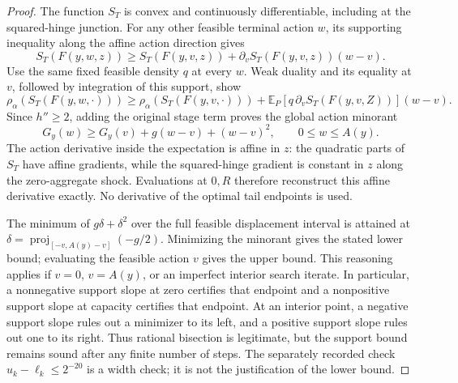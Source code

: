 \begin{proof}
The function $S_T$ is convex and continuously differentiable, including
at the squared-hinge junction.  For any other feasible terminal action $w$,
its supporting inequality along the affine action direction gives
\[
 S_T(F(y,w,z))\ge S_T(F(y,v,z))
           +\partial_vS_T(F(y,v,z))(w-v).
\]
Use the same fixed feasible density $q$ at every $w$.  Weak duality
and its equality at $v$, followed by integration of this support, show
\[
 \rho_\alpha(S_T(F(y,w,\cdot)))
 \ge\rho_\alpha(S_T(F(y,v,\cdot)))
       +\mathbb E_P[q\,\partial_vS_T(F(y,v,Z))](w-v).
\]
Since $h''\ge2$, adding the original stage term proves the global
action minorant
\begin{equation}\label{eq:independentnodeminorant119}
 G_y(w)\ge G_y(v)+g(w-v)+(w-v)^2,
 \qquad 0\le w\le A(y).
\end{equation}
The action derivative inside the expectation is affine in $z$:
the quadratic parts of $S_T$ have affine gradients, while the
squared-hinge gradient is constant in $z$ along the zero-aggregate
shock.  Evaluations at $0,R$ therefore reconstruct this affine
derivative exactly.  No derivative of the optimal tail endpoints is used.

The minimum of $g\delta+\delta^2$ over the full feasible displacement
interval is attained at
$\delta=\operatorname{proj}_{[-v,A(y)-v]}(-g/2)$.
Minimizing the minorant gives the stated lower bound; evaluating the
feasible action $v$ gives the upper bound.  This reasoning applies if
$v=0$, $v=A(y)$, or an imperfect interior search iterate.  In
particular, a nonnegative support slope at zero certifies that endpoint
and a nonpositive support slope at capacity certifies that endpoint.
At an interior point, a negative support slope rules out a minimizer
to its left, and a positive support slope rules out one to its right.
Thus rational bisection is legitimate, but the support bound remains
sound after any finite number of steps.  The separately recorded check
$u_k-\ell_k\le2^{-20}$ is a width check; it is not the justification
of the lower bound.


\end{proof}
